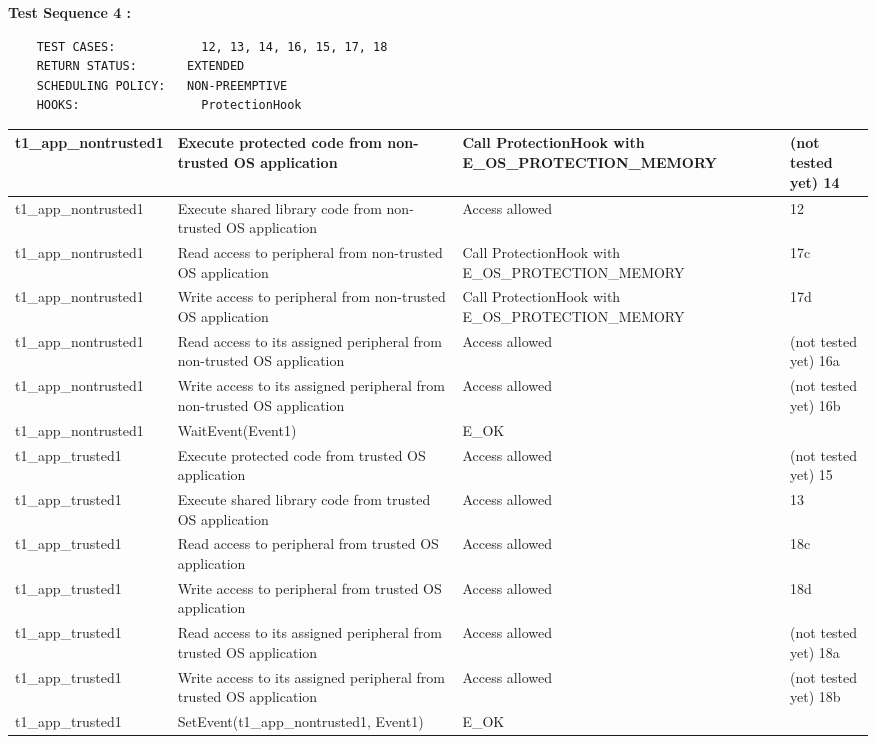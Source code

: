\documentclass[10pt]{article}
\newlength{\Li}\settowidth{\Li}{Running}
\newlength{\Lii}\setlength{\Lii}{7cm}
\newlength{\Liiii}\setlength{\Liiii}{0.9cm}
\newlength{\Liii}\setlength{\Liii}{\textwidth} \addtolength{\Liii}{-\Li} \addtolength{\Liii}{-\Lii} \addtolength{\Liii}{-\Liiii}
\begin{document}
	\textbf{Test Sequence 4 :}
	\begin{lstlisting}
	TEST CASES:		       12, 13, 14, 16, 15, 17, 18
	RETURN STATUS:	  	 EXTENDED
	SCHEDULING POLICY:   NON-PREEMPTIVE
	HOOKS:		           ProtectionHook
	\end{lstlisting}
	

	\begin{supertabular}{|p{\Li}|p{\Lii}|p{\Liii}|p{\Liiii}|} \hline 
	t1\_app\_nontrusted1	& Execute protected code from non-trusted OS application		& Call ProtectionHook with E\_OS\_PROTECTION\_MEMORY	& (not tested yet) 14 \\ \hline
	t1\_app\_nontrusted1	& Execute shared library code from non-trusted OS application 	& Access allowed									& 12 \\ \hline
	t1\_app\_nontrusted1	& Read access to peripheral from non-trusted OS application 		& Call ProtectionHook with E\_OS\_PROTECTION\_MEMORY		& 17c \\ \hline
	t1\_app\_nontrusted1	& Write access to peripheral from non-trusted OS application 		& Call ProtectionHook with E\_OS\_PROTECTION\_MEMORY		& 17d \\ \hline
	t1\_app\_nontrusted1	& Read access to its assigned peripheral from non-trusted OS application	& Access allowed						& (not tested yet) 16a \\ \hline
	t1\_app\_nontrusted1	& Write access to its assigned peripheral from non-trusted OS application	& Access allowed						& (not tested yet) 16b \\ \hline
	
	t1\_app\_nontrusted1	& WaitEvent(Event1)										& E\_OK											& \\ \hline
	
	t1\_app\_trusted1		& Execute protected code from trusted OS application			& Access allowed									& (not tested yet) 15 \\ \hline
	t1\_app\_trusted1		& Execute shared library code from trusted OS application 		& Access allowed									& 13 \\ \hline
	t1\_app\_trusted1		& Read access to peripheral from trusted OS application 	& Access allowed									& 18c \\ \hline
	t1\_app\_trusted1		& Write access to peripheral from trusted OS application 	& Access allowed									& 18d \\ \hline
	t1\_app\_trusted1		& Read access to its assigned peripheral from trusted OS application	& Access allowed							& (not tested yet) 18a \\ \hline
	t1\_app\_trusted1		& Write access to its assigned peripheral from trusted OS application	& Access allowed							& (not tested yet) 18b \\ \hline
	t1\_app\_trusted1		& SetEvent(t1\_app\_nontrusted1, Event1)					& E\_OK											& \\ \hline
	

\end{supertabular}
\end{document}
